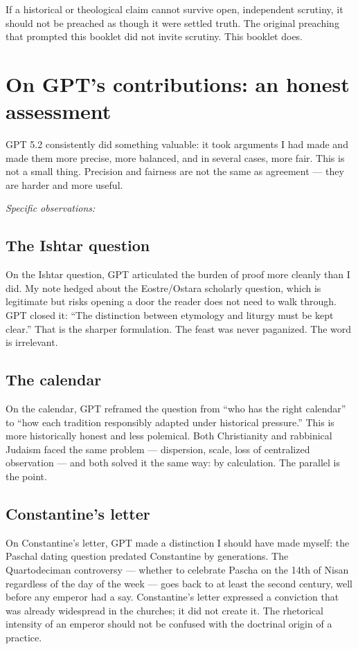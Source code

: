 \documentclass[10pt,twoside,openany]{book}
\begin{document}
If a historical or theological claim cannot survive open, independent
scrutiny, it should not be preached as though it were settled truth.
The original preaching that prompted this booklet did not invite
scrutiny. This booklet does.

\section{On GPT's contributions: an honest assessment}

GPT 5.2 consistently did something valuable: it took arguments I had
made and made them more precise, more balanced, and in several cases,
more fair. This is not a small thing. Precision and fairness are not
the same as agreement --- they are harder and more useful.

\medskip
\textit{Specific observations:}

\subsection{The Ishtar question}

On the Ishtar question, GPT articulated the burden of proof more
cleanly than I did. My note hedged about the Eostre/Ostara scholarly
question, which is legitimate but risks opening a door the reader does
not need to walk through. GPT closed it: ``The distinction between
etymology and liturgy must be kept clear.'' That is the sharper
formulation. The feast was never paganized. The word is irrelevant.

\subsection{The calendar}

On the calendar, GPT reframed the question from ``who has the right
calendar'' to ``how each tradition responsibly adapted under historical
pressure.'' This is more historically honest and less polemical. Both
Christianity and rabbinical Judaism faced the same problem --- dispersion,
scale, loss of centralized observation --- and both solved it the same
way: by calculation. The parallel is the point.

\subsection{Constantine's letter}

On Constantine's letter, GPT made a distinction I should have made
myself: the Paschal dating question predated Constantine by generations.
The Quartodeciman controversy --- whether to celebrate Pascha on the 14th
of Nisan regardless of the day of the week --- goes back to at least the
second century, well before any emperor had a say. Constantine's letter
expressed a conviction that was already widespread in the churches; it
did not create it. The rhetorical intensity of an emperor should not be
confused with the doctrinal origin of a practice.
\end{document}
